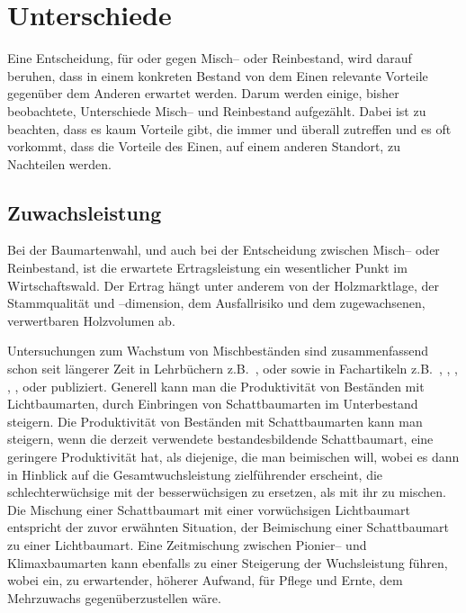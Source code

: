 \documentclass[twocolumn]{scrartcl}
\begin{document}
\section{Unterschiede}
\label{sec:unterschiede}

Eine Entscheidung, für oder gegen Misch-- oder Reinbestand, wird darauf beruhen,
dass in einem konkreten Bestand von dem Einen relevante Vorteile gegenüber dem
Anderen erwartet werden. Darum werden einige, bisher beobachtete, Unterschiede
Misch-- und Reinbestand aufgezählt. Dabei ist zu beachten, dass es kaum Vorteile
gibt, die immer und überall zutreffen und es oft vorkommt, dass die Vorteile des
Einen, auf einem anderen Standort, zu Nachteilen werden.

\subsection{Zuwachsleistung}
\label{ssec:zuwachs}

Bei der Baumartenwahl, und auch bei der Entscheidung zwischen Misch--
oder Reinbestand, ist die erwartete Ertragsleistung ein wesentlicher
Punkt im Wirtschaftswald. Der Ertrag hängt unter anderem von der
Holzmarktlage, der Stammqualität und --dimension, dem Ausfallrisiko
und dem zugewachsenen, verwertbaren Holzvolumen ab.

Untersuchungen zum Wachstum von Mischbeständen sind zusammenfassend schon seit
längerer Zeit in Lehrbüchern z.B.\ \cite{wiedemann1951Ertragskunde},
\cite{assmann1961Waldertraskunde} oder \cite{mitscherlich1978WaldWachstumUmwelt}
sowie in Fachartikeln z.B.\ \cite{baader1942WasLeistetDerMischbestand},
\cite{kennel1965MischbestandFichteBuche},
\cite{mitscherlich196566ReinUndMischbestand}, \cite{guericke2001mischungBuLae},
\cite{pretzsch2003mischwald}, \cite{bauhus2004mischung} oder
\cite{kelty2006mischwald} publiziert. Generell kann man die Produktivität von
Beständen mit Lichtbaumarten, durch Einbringen von Schattbaumarten im
Unterbestand steigern. Die Produktivität von Beständen mit Schattbaumarten kann
man steigern, wenn die derzeit verwendete bestandesbildende Schattbaumart, eine
geringere Produktivität hat, als diejenige, die man beimischen will, wobei es
dann in Hinblick auf die Gesamtwuchsleistung zielführender erscheint, die
schlechterwüchsige mit der besserwüchsigen zu ersetzen, als mit ihr zu mischen.
Die Mischung einer Schattbaumart mit einer vorwüchsigen Lichtbaumart entspricht
der zuvor erwähnten Situation, der Beimischung einer Schattbaumart zu einer
Lichtbaumart. Eine Zeitmischung zwischen Pionier-- und Klimaxbaumarten kann
ebenfalls zu einer Steigerung der Wuchsleistung führen, wobei ein, zu
erwartender, höherer Aufwand, für Pflege und Ernte, dem Mehrzuwachs
gegenüberzustellen wäre.
\end{document}
